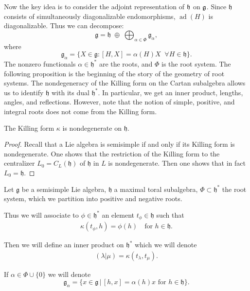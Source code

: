 \documentclass[12pt]{article}
\begin{document}
Now the key idea is to consider the adjoint representation of $\mathfrak{h}$ on $\mathfrak{g}$. Since $\mathfrak{h}$ consists of simultaneously diagonalizable endomorphisms, $\operatorname{ad}(H)$ is diagonalizable. Thus we can decompose:
\[
    \mathfrak{g} = \mathfrak{h} \;\oplus\; \bigoplus_{\alpha \in \Phi} \mathfrak{g}_\alpha,
\]
where
\[
    \mathfrak{g}_\alpha = \{ X \in \mathfrak{g} : [H,X] = \alpha(H) X \;\;\forall H\in \mathfrak{h}\}.
\]
The nonzero functionals $\alpha \in \mathfrak{h}^*$ are the roots, and $\Phi$ is the root system. The following proposition is the beginning of the story of the geometry of root systems. The nondegeneracy of the Killing form on the Cartan subalgebra allows us to identify $\mathfrak{h}$ with its dual $\mathfrak{h}^*$. In particular, we get an inner product, lengths, angles, and reflections. However, note that the notion of simple, positive, and integral roots does not come from the Killing form.

\begin{proposition}[Humphreys 8.2]
    The Killing form $\kappa$ is nondegenerate on $\mathfrak{h}$.
\end{proposition}

\begin{proof}

    Recall that a Lie algebra is semisimple if and only if its Killing form is nondegenerate. One shows that the restriction of the Killing form to the centralizer $L_0 = C_L(\mathfrak{h})$ of $\mathfrak{h}$ in $L$ is nondegenerate. Then one shows that in fact $L_0 = \mathfrak{h}$.
\end{proof}

Let $\mathfrak{g}$ be a semisimple Lie algebra, $\mathfrak{h}$ a maximal toral subalgebra, $\Phi \subset \mathfrak{h}^*$ the root system, which we partition into positive and negative roots.

Thus we will associate to $\phi \in \mathfrak{h}^*$ an element $t_\phi \in \mathfrak{h}$ such that
\begin{align*}
    \kappa(t_\phi, h) = \phi(h) \quad \text{for } h \in \mathfrak{h}.
\end{align*}

Then we will define an inner product on $\mathfrak{h}^*$ which we will denote
\begin{align*}
    (\lambda | \mu) = \kappa(t_\lambda, t_\mu).
\end{align*}

If $\alpha \in \Phi \cup \{0\}$ we will denote
\[
    \mathfrak{g}_\alpha = \{x \in \mathfrak{g} \,|\, [h,x] = \alpha(h)x \text{ for } h \in \mathfrak{h} \}.
\]
\end{document}
